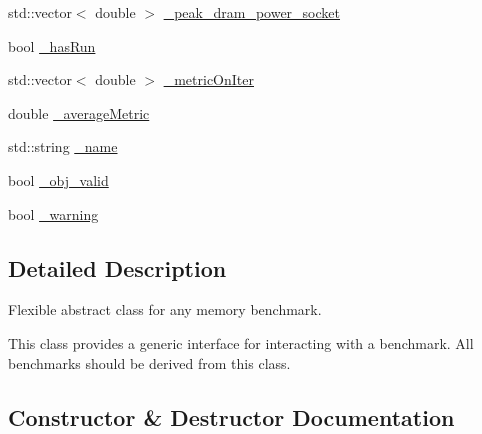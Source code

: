 \begin{DoxyCompactItemize}
std\+::vector$<$ double $>$ \hyperlink{classxmem_1_1benchmark_1_1_benchmark_a4da600693ba1df4fb69c1304b23b2cde}{\+\_\+peak\+\_\+dram\+\_\+power\+\_\+socket}
\item 
bool \hyperlink{classxmem_1_1benchmark_1_1_benchmark_a7caa584aa404d7751b781fd16c111fd0}{\+\_\+has\+Run}
\item 
std\+::vector$<$ double $>$ \hyperlink{classxmem_1_1benchmark_1_1_benchmark_a1c3ef60ba77f151cc4d5b4b77d2deefa}{\+\_\+metric\+On\+Iter}
\item 
double \hyperlink{classxmem_1_1benchmark_1_1_benchmark_a303386b7b243e39f2ca9a041ae819162}{\+\_\+average\+Metric}
\item 
std\+::string \hyperlink{classxmem_1_1benchmark_1_1_benchmark_ab9653ef73e0f1ca01e08286bdb35e4a6}{\+\_\+name}
\item 
bool \hyperlink{classxmem_1_1benchmark_1_1_benchmark_a87e133558776380738354191ec5e6560}{\+\_\+obj\+\_\+valid}
\item 
bool \hyperlink{classxmem_1_1benchmark_1_1_benchmark_af1a72e70f81c91f7c004ae01b2353288}{\+\_\+warning}
\end{DoxyCompactItemize}


\subsection{Detailed Description}
Flexible abstract class for any memory benchmark. 

This class provides a generic interface for interacting with a benchmark. All benchmarks should be derived from this class. 

\subsection{Constructor \& Destructor Documentation}
\hypertarget{classxmem_1_1benchmark_1_1_benchmark_a6eda9023866fc80e334d7d8d2a220817}{}
